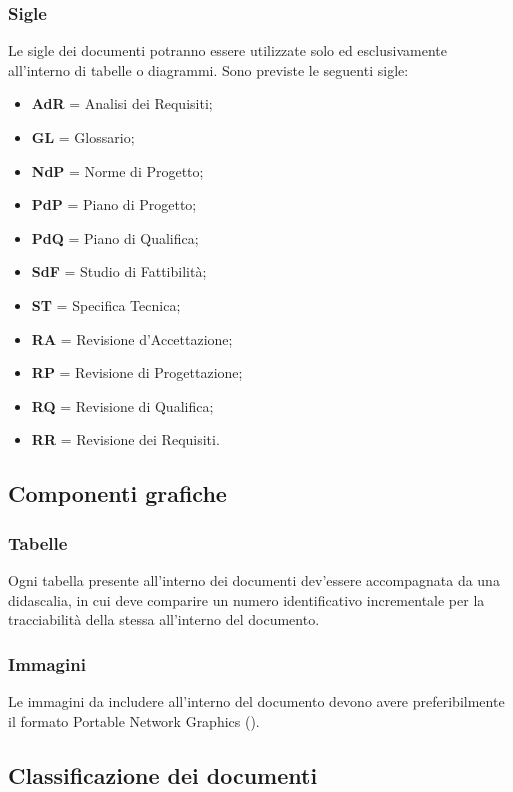       \subsubsection{Sigle}
        Le sigle dei documenti potranno essere utilizzate solo ed esclusivamente all'interno di tabelle o diagrammi. Sono previste le seguenti sigle:
        \begin{itemize}
          \item \textbf{AdR} = Analisi dei Requisiti;
          \item \textbf{GL} = Glossario;
          \item \textbf{NdP} = Norme di Progetto;
          \item \textbf{PdP} = Piano di Progetto;
          \item \textbf{PdQ} = Piano di Qualifica;
          \item \textbf{SdF} = Studio di Fattibilità;
          \item \textbf{ST} = Specifica Tecnica;
          \item \textbf{RA} = Revisione d'Accettazione;
          \item \textbf{RP} = Revisione di Progettazione;
          \item \textbf{RQ} = Revisione di Qualifica;
          \item \textbf{RR} = Revisione dei Requisiti.
        \end{itemize}
    \subsection{Componenti grafiche}
      \subsubsection{Tabelle}
        Ogni tabella presente all’interno dei documenti dev’essere accompagnata da una didascalia, in cui deve comparire un numero identificativo incrementale per la tracciabilità
        della stessa all’interno del documento.
      \subsubsection{Immagini}
        Le immagini da includere all'interno del documento devono avere preferibilmente il formato Portable Network Graphics ().
    \subsection{Classificazione dei documenti}
